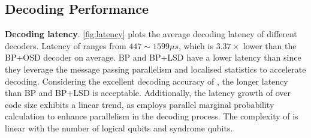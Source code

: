 


\subsection{Decoding Performance}

\textbf{Decoding latency}.
\autoref{fig:latency} plots the average decoding latency of different decoders. Latency of \papername ranges from $447\sim 1599 \mu s$, which is $3.37\times$ lower than the BP+OSD decoder on average. BP and BP+LSD have a lower latency than \papername since they leverage the message passing parallelism and localised statistics to accelerate decoding. Considering the excellent decoding accuracy of \papername, the longer latency than BP and BP+LSD is acceptable. Additionally, the latency growth of \papername over code size exhibits a linear trend, as \papername employs parallel marginal probability calculation to enhance parallelism in the decoding process. The complexity of \papername is linear with the number of logical qubits and syndrome qubits.



